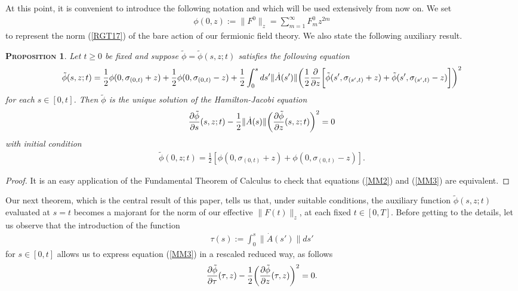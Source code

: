 \documentclass[12pt,twoside]{amsart}
\newcommand{\beq}{\begin{equation}}
\newcommand{\eeq}{\end{equation}}
\newtheorem{prop}{\textsc{Proposition}} [section]
\numberwithin{equation}{section}
\begin{document}
At this point, it is convenient to introduce the following notation and which will be used extensively from now on. We set
\begin{eqnarray}
\phi(0,z) := \|F^{0}\|_{z} = \sum_{m=1}^{\infty}F_{m}^{0}z^{2m} \label{MM1}
\end{eqnarray}
to represent the norm (\ref{RGT17}) of the bare action of our fermionic field theory. We also state the following auxiliary result.  

\begin{prop}\label{auxiliarymajorant} Let $t \ge 0$ be fixed and suppose $\tilde{\phi} = \tilde{\phi}(s,z;t)$ satisfies the following equation
\beq
\tilde{\phi}(s,z;t) = \frac{1}{2}\phi(0,\sigma_{(0,t)}+z)+\frac{1}{2}\phi(0,\sigma_{(0,t)}-z) + \frac{1}{2}\int_{0}^{s} ds' \|\dot{A}(s')\|\bigg{(}\frac{1}{2}\frac{\partial}{\partial z}\bigg{[}\tilde{\phi}(s',\sigma_{(s',t)}+z)+\tilde{\phi}(s',\sigma_{(s',t)}-z)\bigg{]}\bigg{)}^{2} \label{MM2}
\eeq
for each $s \in [0,t]$. Then $\tilde{\phi}$ is the unique solution of the Hamilton-Jacobi equation
\begin{eqnarray}
\frac{\partial\tilde{\phi}}{\partial s}(s,z;t) -\frac{1}{2}\|\dot{A}(s)\|\bigg{(}\frac{\partial \tilde{\phi}}{\partial z}(s,z;t)\bigg{)}^{2} = 0 \label{MM3}
\end{eqnarray}
with initial condition
\begin{eqnarray}
\tilde{\phi}(0,z;t) = \frac{1}{2}[\phi(0,\sigma_{(0,t)}+z)+\phi(0,\sigma_{(0,t)}-z)]. \label{MM4}
\end{eqnarray}
\end{prop}
\begin{proof} It is an easy application of the Fundamental Theorem of Calculus to check that equations (\ref{MM2}) and (\ref{MM3}) are equivalent.
\end{proof}

Our next theorem, which is the central result of this paper, tells us that, under suitable conditions, the auxiliary function $\tilde{\phi}(s,z;t)$ evaluated at $s=t$ becomes a majorant for the norm of our effective $\|F(t)\|_{z}$, at each fixed $t \in [0,T]$. Before getting to the details, let us observe that the introduction of the function
\begin{eqnarray}
\tau(s) := \int_{0}^{s}\|\dot{A}(s')\|ds' \label{MM5}
\end{eqnarray}
for $s \in [0,t]$ allows us to express equation (\ref{MM3}) in a rescaled reduced way, as follows
\begin{eqnarray}
\frac{\partial \tilde{\phi}}{\partial \tau}(\tau,z) - \frac{1}{2}\bigg{(}\frac{\partial \tilde{\phi}}{\partial z}(\tau,z)\bigg{)}^{2} = 0.  \label{MM6}
\end{eqnarray}
\end{document}
